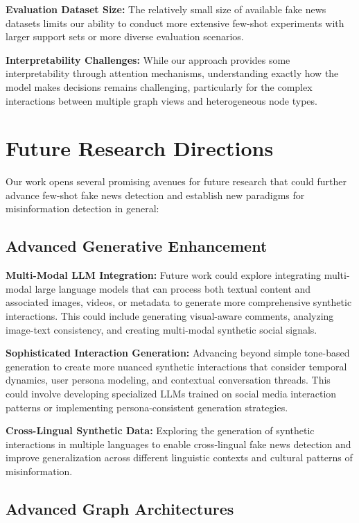 \textbf{Evaluation Dataset Size:} The relatively small size of available fake news datasets limits our ability to conduct more extensive few-shot experiments with larger support sets or more diverse evaluation scenarios.

\textbf{Interpretability Challenges:} While our approach provides some interpretability through attention mechanisms, understanding exactly how the model makes decisions remains challenging, particularly for the complex interactions between multiple graph views and heterogeneous node types.

\section{Future Research Directions}

Our work opens several promising avenues for future research that could further advance few-shot fake news detection and establish new paradigms for misinformation detection in general:

\subsection{Advanced Generative Enhancement}

\textbf{Multi-Modal LLM Integration:} Future work could explore integrating multi-modal large language models that can process both textual content and associated images, videos, or metadata to generate more comprehensive synthetic interactions. This could include generating visual-aware comments, analyzing image-text consistency, and creating multi-modal synthetic social signals.


\textbf{Sophisticated Interaction Generation:} Advancing beyond simple tone-based generation to create more nuanced synthetic interactions that consider temporal dynamics, user persona modeling, and contextual conversation threads. This could involve developing specialized LLMs trained on social media interaction patterns or implementing persona-consistent generation strategies.

\textbf{Cross-Lingual Synthetic Data:} Exploring the generation of synthetic interactions in multiple languages to enable cross-lingual fake news detection and improve generalization across different linguistic contexts and cultural patterns of misinformation.

\subsection{Advanced Graph Architectures}

